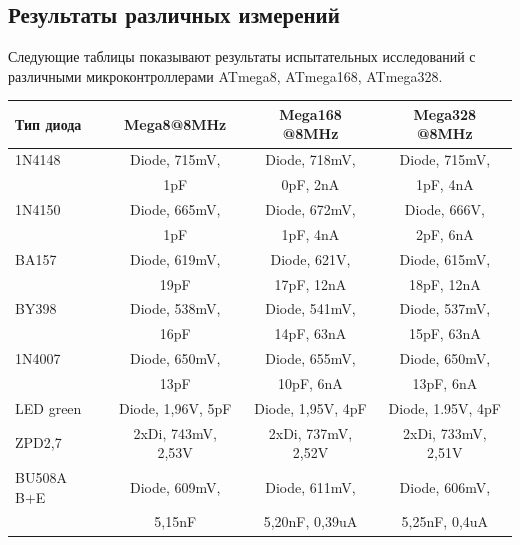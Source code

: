 \subsection{Результаты различных измерений}
Следующие таблицы показывают результаты испытательных исследований с различными микроконтроллерами 
ATmega8, ATmega168, ATmega328.

\begin{table}[H]
  \begin{center}
    \begin{tabular}{| l | c | c | c |}
    \hline
   Тип диода & Mega8@8MHz & Mega168 @8MHz & Mega328 @8MHz \\                
    \hline
    \hline
1N4148     & Diode, 715mV,        & Diode, 718mV,            & Diode, 715mV,           \\
           &               1pF    &               0pF, 2nA   &               1pF, 4nA  \\
    \hline
1N4150     & Diode, 665mV,        & Diode, 672mV,            & Diode, 666V,           \\
           &               1pF    &               1pF, 4nA   &              2pF, 6nA  \\
    \hline
BA157      & Diode, 619mV,        & Diode, 621V,              & Diode, 615mV,            \\
           &               19pF   &              17pF, 12nA   &               18pF, 12nA \\
    \hline
BY398      & Diode, 538mV,        & Diode, 541mV,             & Diode, 537mV,            \\
           &               16pF   &               14pF, 63nA  &               15pF, 63nA \\
    \hline
1N4007     & Diode, 650mV,        & Diode, 655mV,            & Diode, 650mV,           \\
           &               13pF   &               10pF, 6nA  &               13pF, 6nA \\
    \hline
LED green  & Diode, 1,96V, 5pF    & Diode, 1,95V, 4pF   & Diode, 1.95V, 4pF \\
    \hline
ZPD2,7     & 2xDi, 743mV, 2,53V   & 2xDi, 737mV, 2,52V  & 2xDi, 733mV, 2,51V \\
    \hline
BU508A B+E & Diode, 609mV,        & Diode, 611mV,                & Diode, 606mV,              \\
           &               5,15nF &               5,20nF, 0,39uA &               5,25nF, 0,4uA\\

\end{tabular}
\end{center}
\end{table}
